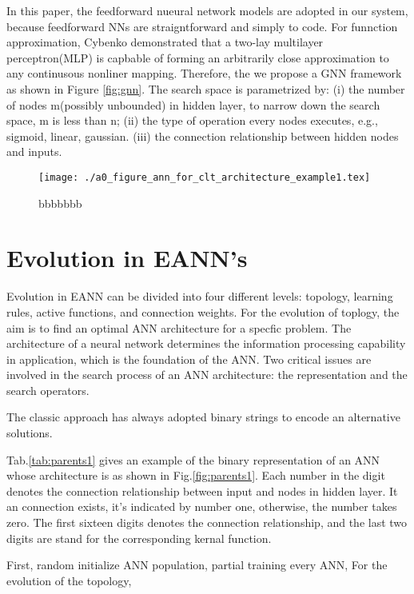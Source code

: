 
In this paper, the feedforward nueural network models are adopted in our
system, because feedforward NNs are straigntforward and simply to code.  For
funnction approximation, Cybenko demonstrated that a two-lay multilayer
perceptron(MLP) is capbable of forming an arbitrarily close approximation to
any continusous nonliner mapping\cite{cybenko1989approximation}. Therefore, the
we propose a GNN framework as shown in Figure \ref{fig:gnn}. The search space
is parametrized by: (i) the number of nodes m(possibly unbounded) in hidden
layer, to narrow down the search space, m is less than n; (ii) the type of
operation every nodes executes, e.g., sigmoid, linear, gaussian. (iii) the
connection relationship between hidden nodes and inputs.


\begin{figure}[ht]
	\centering
	\texttt{[image: ./a0\_figure\_ann\_for\_clt\_architecture\_example1.tex]}
	\label{fig:parent1}
	\caption{bbbbbbb}
\end{figure}



%





\section{Evolution in EANN's}

Evolution in EANN can be divided into four different levels: topology, learning
rules, active functions, and connection weights. For the evolution of toplogy,
the aim is to find an optimal ANN architecture for a specfic problem. The
architecture of a neural network determines the information processing
capability in application, which is the foundation of the ANN. Two critical
issues are involved in the search process of an ANN architecture: the
representation and the search operators.

The classic approach has always adopted binary strings to encode an alternative solutions. 


Tab.\ref{tab:parents1}  gives an example of the binary representation of an ANN
whose architecture is as shown in Fig.\ref{fig:parents1}. Each number in the
digit denotes the connection relationship between input and nodes in hidden
layer. It an connection exists, it's indicated by number one, otherwise, the
number takes zero. The first sixteen digits denotes the connection relationship, and the
last two digits are stand for  the corresponding kernal function. 

First,  random initialize ANN population, partial training every ANN, 
For the evolution of the topology,










